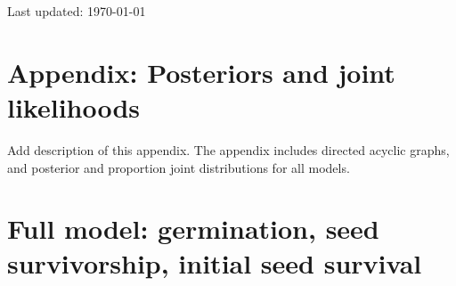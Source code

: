 \documentclass[12pt, oneside, titlepage]{article}   	%
\begin{document}
Last updated: \today

\section{Appendix: Posteriors and joint likelihoods}

Add description of this appendix. The appendix includes directed acyclic graphs, and posterior and proportion joint distributions for all models.

\clearpage
\newpage

\section{Full model: germination, seed survivorship, initial seed survival}
\end{document}
